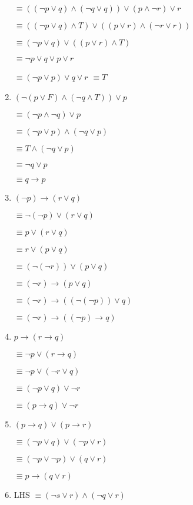 \documentclass{../../cls/sig-alternate-05-2015}
\begin{document}
\begin{enumerate}
$\equiv ((\neg p\vee q)\wedge (\neg q\vee q) ) \vee (p \wedge \neg r) \vee r$

$\equiv ((\neg p\vee q)\wedge T) \vee ((p \vee r) \wedge (\neg r \vee r)) $

$\equiv (\neg p\vee q) \vee ((p \vee r) \wedge T) $

$\equiv \neg p\vee q \vee p \vee r $

$\equiv (\neg p \vee p)\vee q \vee r $
$\equiv T $
\item  $(\neg(p \vee F) \wedge (\neg q \wedge T)) \vee p$

$\equiv (\neg p \wedge \neg q)\vee p$

$\equiv (\neg p\vee p) \wedge (\neg q \vee p)$

 $\equiv T \wedge (\neg q \vee p)$

 $\equiv \neg q \vee p$
  
  $\equiv  q \rightarrow p$
 
 \item $ (\neg p) \rightarrow (r\vee q)$
 
 $\equiv  \neg(\neg p) \vee (r\vee q)$

$\equiv  p \vee (r\vee q)$

$\equiv  r \vee (p\vee q)$

$\equiv  (\neg(\neg r)) \vee (p\vee q)$

$\equiv  (\neg r)\rightarrow (p\vee q)$

$\equiv  (\neg r)\rightarrow ((\neg(\neg p))\vee q)$

$\equiv  (\neg r)\rightarrow ((\neg p)\rightarrow q)$

\item $p \rightarrow (r \rightarrow q)$

$\equiv \neg p \vee  (r \rightarrow q)$

$\equiv \neg p \vee  (\neg r \vee q)$

$\equiv (\neg p \vee   q) \vee \neg r$

$\equiv ( p \rightarrow q) \vee \neg r$

\item  $(p \rightarrow q) \vee (p \rightarrow r)$

$\equiv (\neg p \vee q) \vee (\neg p \vee r)$

$\equiv (\neg p \vee \neg p) \vee ( q \vee r)$

$\equiv  p \rightarrow ( q \vee r)$

\item LHS $\equiv (\neg s \vee r) \wedge (\neg q \vee r)$


\end{enumerate}
\end{document}
